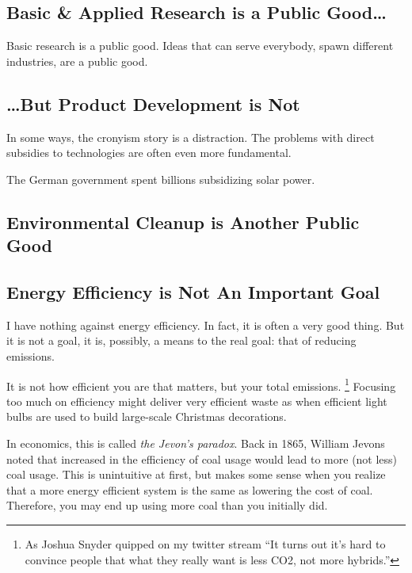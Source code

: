 \subsection{Basic \& Applied Research is a Public Good\ldots}

Basic research is a public good. Ideas that can serve everybody, spawn
different industries, are a public good.

\subsection{\ldots But Product Development is Not}

In some ways, the cronyism story is a distraction. The problems with direct
subsidies to technologies are often even more fundamental.

The German government spent billions subsidizing solar power.

\subsection{Environmental Cleanup is Another Public Good}

\subsection{Energy Efficiency is Not An Important Goal}

I have nothing against energy efficiency. In fact, it is often a very good
thing. But it is not a goal, it is, possibly, a means to the real goal: that of
reducing emissions.

It is not how efficient you are that matters, but your total emissions.
\footnote{As Joshua Snyder quipped on my twitter stream ``It turns out it's
hard to convince people that what they really want is less CO2, not more
hybrids.''
} Focusing too much on efficiency might deliver very efficient waste as when
efficient light bulbs are used to build large-scale Christmas
decorations.

In economics, this is called \emph{the Jevon's paradox}. Back in 1865, William
Jevons noted that increased in the efficiency of coal usage would lead to more
(not less) coal usage. This is unintuitive at first, but makes some sense when
you realize that a more energy efficient system is the same as lowering the
cost of coal. Therefore, you may end up using more coal than you initially did.

